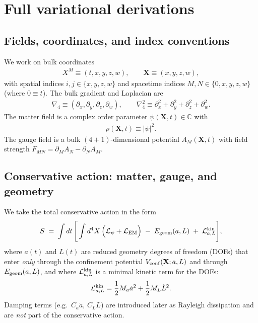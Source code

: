 \documentclass[11pt]{article}
\begin{document}
\section{Full variational derivations}
\label{app:variational}

\subsection{Fields, coordinates, and index conventions}
We work on bulk coordinates
\begin{align}
X^M \equiv (t,x,y,z,w), \qquad \mathbf{X}\equiv(x,y,z,w),
\end{align}
with spatial indices $i,j\in\{x,y,z,w\}$ and spacetime indices $M,N\in\{0,x,y,z,w\}$
(where $0\equiv t$).  The bulk gradient and Laplacian are
\begin{align}
\nabla_4 \equiv (\partial_x,\partial_y,\partial_z,\partial_w),\qquad
\nabla_4^2 \equiv \partial_x^2+\partial_y^2+\partial_z^2+\partial_w^2.
\end{align}
The matter field is a complex order parameter $\psi(\mathbf{X},t)\in\mathbb{C}$ with
\begin{align}
\rho(\mathbf{X},t) \equiv |\psi|^2.
\end{align}
The gauge field is a bulk $(4{+}1)$-dimensional potential $A_M(\mathbf{X},t)$ with
field strength $F_{MN}=\partial_M A_N-\partial_N A_M$.

\subsection{Conservative action: matter, gauge, and geometry}
We take the total conservative action in the form
\begin{align}
S \;=\; \int dt \,\Bigg[
\int d^4X\,\Big(\mathcal{L}_\psi+\mathcal{L}_{\rm EM}\Big)\;-\;E_{\rm geom}(a,L)
\;+\;\mathcal{L}_{a,L}^{\rm kin}
\Bigg],
\label{eq:total_action}
\end{align}
where $a(t)$ and $L(t)$ are reduced geometry degrees of freedom (DOFs) that enter
\emph{only} through the confinement potential $V_{\rm conf}(\mathbf{X};a,L)$ and
through $E_{\rm geom}(a,L)$, and where $\mathcal{L}_{a,L}^{\rm kin}$ is a minimal
kinetic term for the DOFs:
\begin{align}
\mathcal{L}_{a,L}^{\rm kin} = \frac{1}{2}M_a \dot a^2 + \frac{1}{2}M_L \dot L^2.
\label{eq:geom_kinetic}
\end{align}
Damping terms (e.g.\ $C_a\dot a$, $C_L\dot L$) are introduced later as Rayleigh
dissipation and are \emph{not} part of the conservative action.
\end{document}
